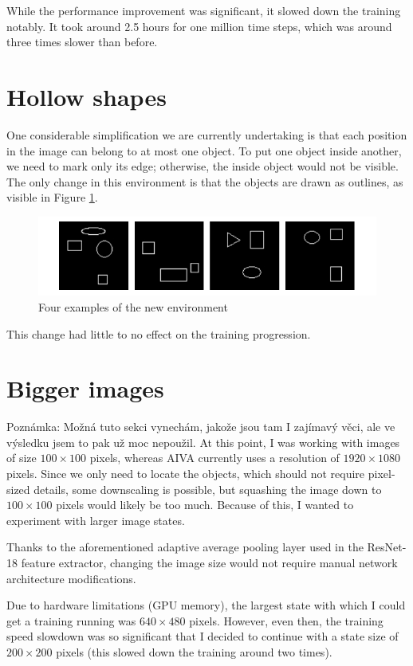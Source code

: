 \documentclass[
  digital,     %
  oneside,     %
  nosansbold,  %
  nocolorbold, %
  lof,         %
  lot,         %
]{fithesis4}
\begin{document}
While the performance improvement was significant, it slowed down the training notably. It took around 2.5 hours for one million time steps, which was around three times slower than before.

\section{Hollow shapes}
One considerable simplification we are currently undertaking is that each position in the image can belong to at most one object. To put one object inside another, we need to mark only its edge; otherwise, the inside object would not be visible. The only change in this environment is that the objects are drawn as outlines, as visible in Figure \ref{fig:env5}.

\begin{figure}
    \centering
    \includegraphics[width=1\linewidth]{env_examples/env5.pdf}
    \caption{Four examples of the new environment}
    \label{fig:env5}
\end{figure}
 
This change had little to no effect on the training progression.

\section{Bigger images}
Poznámka: Možná tuto sekci vynechám, jakože jsou tam I zajímavý věci, ale ve výsledku jsem to pak už moc nepoužil.
At this point, I was working with images of size $100\times100$ pixels, whereas AIVA currently uses a resolution of $1920\times1080$ pixels. Since we only need to locate the objects, which should not require pixel-sized details, some downscaling is possible, but squashing the image down to $100\times100$ pixels would likely be too much. Because of this, I wanted to experiment with larger image states.

Thanks to the aforementioned adaptive average pooling layer used in the ResNet-18 feature extractor, changing the image size would not require manual network architecture modifications.

Due to hardware limitations (GPU memory), the largest state with which I could get a training running was $640\times480$ pixels. However, even then, the training speed slowdown was so significant that I decided to continue with a state size of $200\times200$ pixels (this slowed down the training around two times).
\end{document}
